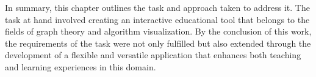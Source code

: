 In summary, this chapter outlines the task and approach taken to address it. The task at hand involved creating an interactive educational tool that belongs to the fields of graph theory and algorithm visualization. By the conclusion of this work, the requirements of the task were not only fulfilled but also extended through the development of a flexible and versatile application that enhances both teaching and learning experiences in this domain.